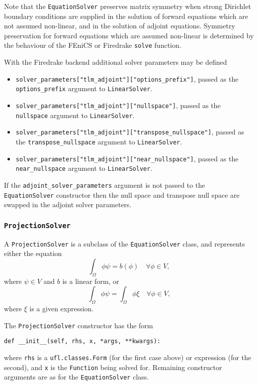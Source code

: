 \documentclass[11pt]{article}
\begin{document}
Note that the \texttt{EquationSolver} preserves matrix symmetry when strong
Dirichlet boundary conditions are supplied in the solution of forward equations
which are not assumed non-linear, and in the solution of adjoint equations.
Symmetry preservation for forward equations which are assumed non-linear is
determined by the behaviour of the FEniCS or Firedrake \texttt{solve} function.

With the Firedrake backend additional solver parameters may be defined
\begin{itemize}
  \item \texttt{solver\_parameters["tlm\_adjoint"]["options\_prefix"]}, passed
    as the \texttt{options\_prefix} argument to \texttt{LinearSolver}.
  \item \texttt{solver\_parameters["tlm\_adjoint"]["nullspace"]},
    passed as the \texttt{nullspace} argument to \texttt{LinearSolver}. 
  \item \texttt{solver\_parameters["tlm\_adjoint"]["transpose\_nullspace"]},
    passed as the \texttt{transpose\_nullspace} argument to
    \texttt{LinearSolver}. 
  \item \texttt{solver\_parameters["tlm\_adjoint"]["near\_nullspace"]}, passed
    as the \texttt{near\_nullspace} argument to \texttt{LinearSolver}. 
\end{itemize}
If the \texttt{adjoint\_solver\_parameters} argument is not passed to the
\texttt{EquationSolver} constructor then the null space and transpose null
space are swapped in the adjoint solver parameters.

\subsubsection{\texttt{ProjectionSolver}}

A \texttt{ProjectionSolver} is a subclass of the \texttt{EquationSolver} class,
and represents either the equation
\begin{equation*}
  \int_\Omega \phi \psi = b \left( \phi \right) \quad \forall \phi \in V,
\end{equation*}
where $\psi \in V$ and $b$ is a linear form, or
\begin{equation*}
  \int_\Omega \phi \psi = \int_\Omega \phi \xi \quad \forall \phi \in V,
\end{equation*}
where $\xi$ is a given expression.

The \texttt{ProjectionSolver} constructor has the form
\begin{lstlisting}
def __init__(self, rhs, x, *args, **kwargs):
\end{lstlisting}
where \texttt{rhs} is a \texttt{ufl.classes.Form} (for the first case above) or
expression (for the second), and \texttt{x} is the \texttt{Function} being
solved for. Remaining constructor arguments are as for the
\texttt{EquationSolver} class.
\end{document}
